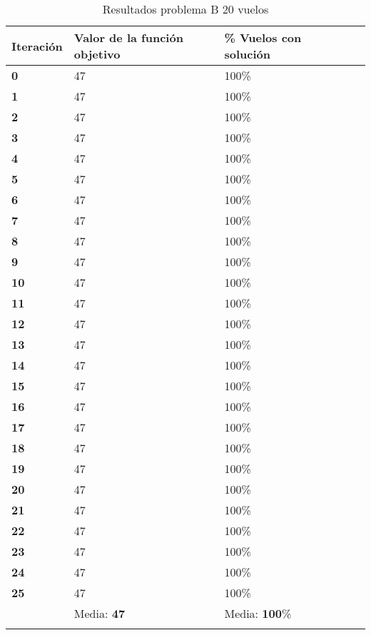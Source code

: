 \begin{longtable}{| p{} | p{} |  p{} | p{}  | p{} | }
	\hline

		\textbf{Iteración} & \textbf{Valor de la función objetivo} &\textbf{\% Vuelos con solución} \\ \hline
		\textbf{0} &47  &100\%  \\ \hline
		\textbf{1} &47  &100\%  \\ \hline
		\textbf{2} &47  &100\%  \\ \hline
		\textbf{3} &47  &100\%  \\ \hline
		\textbf{4} &47  &100\%  \\ \hline
		\textbf{5} &47  &100\%  \\ \hline
		\textbf{6} &47  &100\%  \\ \hline
		\textbf{7} &47  &100\%  \\ \hline
		\textbf{8} &47  &100\%  \\ \hline
		\textbf{9} &47  &100\%  \\ \hline
		\textbf{10} &47  &100\%  \\ \hline
		\textbf{11} &47  &100\%  \\ \hline
		\textbf{12} &47  &100\%  \\ \hline
		\textbf{13} &47  &100\%  \\ \hline
		\textbf{14} &47  &100\%  \\ \hline
		\textbf{15} &47  &100\%  \\ \hline
		\textbf{16} &47  &100\%  \\ \hline
		\textbf{17} &47  &100\%  \\ \hline
		\textbf{18} &47  &100\%  \\ \hline
		\textbf{19} &47  &100\%  \\ \hline
		\textbf{20} &47  &100\%  \\ \hline
		\textbf{21} &47  &100\%  \\ \hline
		\textbf{22} &47  &100\%  \\ \hline
		\textbf{23} &47  &100\%  \\ \hline
		\textbf{24} &47  &100\%  \\ \hline
		\textbf{25} &47  &100\%  \\ \hline
					&Media: \textbf{47}  &Media: \textbf{100}\%  \\ \hline
	\caption{Resultados problema B 20 vuelos } %
	\label{tab: Resultados problema B 20 vuelos}

	
\end{longtable}


